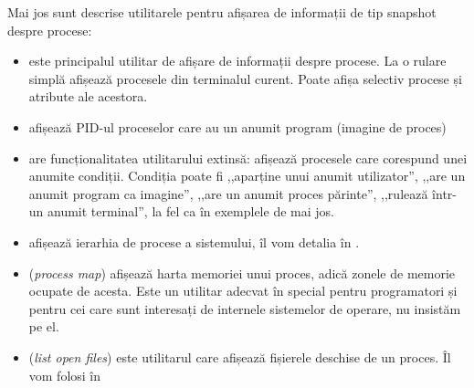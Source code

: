 Mai jos sunt descrise utilitarele pentru afișarea de informații de tip snapshot
despre procese:

\begin{itemize}
  \item {} este principalul utilitar de afișare de informații despre
		procese. La o rulare simplă afișează procesele din terminalul
		curent. Poate afișa selectiv procese și atribute ale acestora.
  \item {} afișează PID-ul proceselor care au un anumit program
		(imagine de proces)
  \item {} are funcționalitatea utilitarului  extinsă: afișează procesele
		care corespund unei anumite condiții. Condiția poate fi
		,,aparține unui anumit utilizator'', ,,are un anumit program ca
		imagine'', ,,are un anumit proces părinte'', ,,rulează într-un
		anumit terminal'', la fel ca în exemplele de mai jos.
  \item {} afișează ierarhia de procese a sistemului, îl vom detalia
    în .
  \item {} (\textit{process map}) afișează harta memoriei unui proces,
		adică zonele de memorie ocupate de acesta. Este un utilitar
		adecvat în special pentru programatori și pentru cei care sunt
		interesați de internele sistemelor de operare, nu insistăm pe
		el.
  \item {} (\textit{list open files}) este utilitarul care afișează
		fișierele deschise de un proces. Îl vom folosi în
\end{itemize}


